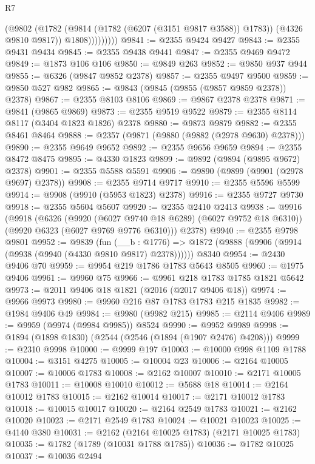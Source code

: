 \begin{lexlean}{R7}
\begin{coremodule}
                    (@9802
                      (@1782 (@9814 (@1782 (@6207 (@3151 @9817 @3588)) @1783)) (@4326 @9810 @9817))
                      @1808)))))))))
@9841 := @2355 @9424 @9427
@9843 := @2355 @9431 @9434
@9845 := @2355 @9438 @9441
@9847 := @2355 @9469 @9472
@9849 := @1873 @106 @106
@9850 := @9849 @263
@9852 := @9850 @937 @944
@9855 := @6326 (@9847 @9852 @2378)
@9857 := @2355 @9497 @9500
@9859 := @9850 @527 @982
@9865 := @9843 (@9845 (@9855 (@9857 @9859 @2378)) @2378)
@9867 := @2355 @8103 @8106
@9869 := @9867 @2378 @2378
@9871 := @9841 (@9865 @9869)
@9873 := @2355 @9519 @9522
@9879 := @2355 @8114 @8117 (@3404 @1823 @1826) @2378
@9880 := @9873 @9879
@9882 := @2355 @8461 @8464
@9888 := @2357 (@9871 (@9880 (@9882 (@2978 @9630) @2378)))
@9890 := @2355 @9649 @9652
@9892 := @2355 @9656 @9659
@9894 := @2355 @8472 @8475
@9895 := @4330 @1823
@9899 := @9892 (@9894 (@9895 @9672) @2378)
@9901 := @2355 @5588 @5591
@9906 := @9890 (@9899 (@9901 (@2978 @9697) @2378))
@9908 := @2355 @9714 @9717
@9910 := @2355 @5596 @5599
@9914 := @9908 (@9910 (@5953 @1823) @2378)
@9916 := @2355 @9727 @9730
@9918 := @2355 @5604 @5607
@9920 := @2355 @2410 @2413
@9938 := @9916
    (@9918
      (@6326
        (@9920 (@6027 @9740 @18 @6289) (@6027 @9752 @18 @6310))
        (@9920 @6323 (@6027 @9769 @9776 @6310)))
      @2378)
@9940 := @2355 @9798 @9801
@9952 := @9839
    (fun (__b : @1776) => @1872 (@9888 (@9906 (@9914 (@9938 (@9940 (@4330 @9810 @9817) @2378))))))
    @8340
@9954 := @2430 @9406 @70
@9959 := @9954 @219 @1786 @1783 @5643 @8505
@9960 := @1975 @9406
@9961 := @9960 @75
@9966 := @9961 @218 @1783 @1785 @1821 @5642
@9973 := @2011 @9406 @18 @1821 (@2016 (@2017 @9406 @18))
@9974 := @9966 @9973
@9980 := @9960 @216 @87 @1783 @1783 @215 @1835
@9982 := @1984 @9406 @49
@9984 := @9980 (@9982 @215)
@9985 := @2114 @9406
@9989 := @9959 (@9974 (@9984 @9985)) @8524
@9990 := @9952 @9989
@9998 := @1894 (@1898 @1830) (@2544 (@2546 (@1894 (@1907 @2476) @4208)))
@9999 := @2310 @9998
@10000 := @9999 @197
@10003 := @10000 @998 @1109 @1788
@10004 := @3151 @4275
@10005 := @10004 @23
@10006 := @2164 @10005
@10007 := @10006 @1783
@10008 := @2162 @10007
@10010 := @2171 @10005 @1783
@10011 := @10008 @10010
@10012 := @5688 @18
@10014 := @2164 @10012 @1783
@10015 := @2162 @10014
@10017 := @2171 @10012 @1783
@10018 := @10015 @10017
@10020 := @2164 @2549 @1783
@10021 := @2162 @10020
@10023 := @2171 @2549 @1783
@10024 := @10021 @10023
@10025 := @4140 @380
@10031 := @2162 (@2164 @10025 @1783) (@2171 @10025 @1783)
@10035 := @1782 (@1789 (@10031 @1788 @1785))
@10036 := @1782 @10025
@10037 := @10036 @2494

\end{coremodule}
\end{lexlean}
